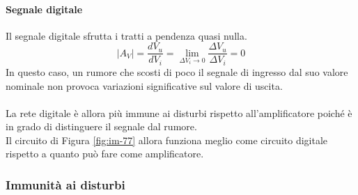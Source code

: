 \documentclass[../main.tex]{subfiles}
\begin{document}
	\paragraph{Segnale digitale}
	Il segnale digitale sfrutta i tratti a pendenza quasi nulla.
	$$|A_V| = \frac{dV_u}{dV_i} = \lim_{\Delta V_i \to 0} \frac{\Delta V_u}{\Delta V_i} = 0$$
	In questo caso, un rumore che scosti di poco il segnale di ingresso dal suo valore nominale non provoca variazioni significative sul valore di uscita.\\\\
	La rete digitale è allora più immune ai disturbi rispetto all’amplificatore poiché è in grado di distinguere il segnale dal rumore. \\
	Il circuito di Figura \ref{fig:im-77} allora funziona meglio come circuito digitale rispetto a quanto può fare come amplificatore.
	\subsubsection{Immunità ai disturbi}
\end{document}
